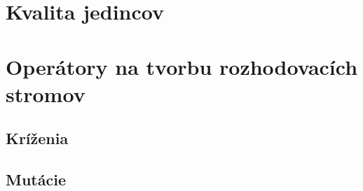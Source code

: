 \section{Kvalita jedincov}\label{kap3:3.3:Fitness}

\section{Operátory na tvorbu rozhodovacích stromov}\label{kap3:3.4:Operators}

\subsection{Kríženia}\label{kap3:3.4:3.4.1:Crossover}
\subsection{Mutácie}\label{kap3:3.4:3.4.2:Mutation}

